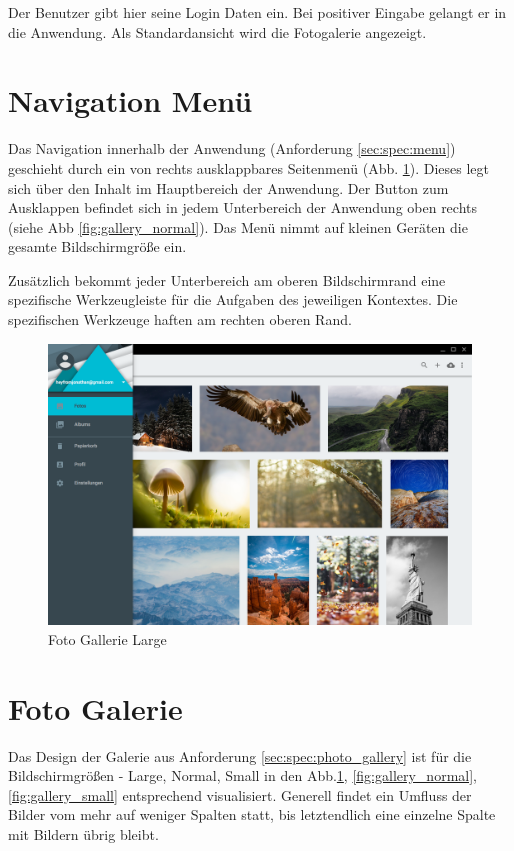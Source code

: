 Der Benutzer gibt hier seine Login Daten ein. Bei positiver Eingabe gelangt er in die Anwendung. Als Standardansicht wird die Fotogalerie angezeigt.

\section{Navigation Menü}
\label{sec:des:navigation_menu}

Das Navigation innerhalb der Anwendung (Anforderung \ref{sec:spec:menu}) geschieht durch ein von rechts ausklappbares Seitenmenü (Abb. \ref{fig:gallery_large}). Dieses legt sich über den Inhalt im Hauptbereich der Anwendung. Der Button zum Ausklappen befindet sich in jedem Unterbereich der Anwendung oben rechts (siehe Abb \ref{fig:gallery_normal}). Das Menü nimmt auf kleinen Geräten die gesamte Bildschirmgröße ein.

Zusätzlich bekommt jeder Unterbereich am oberen Bildschirmrand eine spezifische Werkzeugleiste für die Aufgaben des jeweiligen Kontextes. Die spezifischen Werkzeuge haften am rechten oberen Rand.

\begin{figure}[htp]     %
\centering
\includegraphics[width=1.0\textwidth]{images/gallery_large} 
\caption{Foto Gallerie Large}\label{fig:gallery_large}
\end{figure}

\section{Foto Galerie}
\label{sec:ux:photo_gallery}

Das Design der Galerie aus Anforderung \ref{sec:spec:photo_gallery} ist für die Bildschirmgrößen - Large, Normal, Small in den Abb.\ref{fig:gallery_large}, \ref{fig:gallery_normal}, \ref{fig:gallery_small} entsprechend visualisiert. Generell findet ein Umfluss der Bilder vom mehr auf weniger Spalten statt, bis letztendlich eine einzelne Spalte mit Bildern übrig bleibt.

